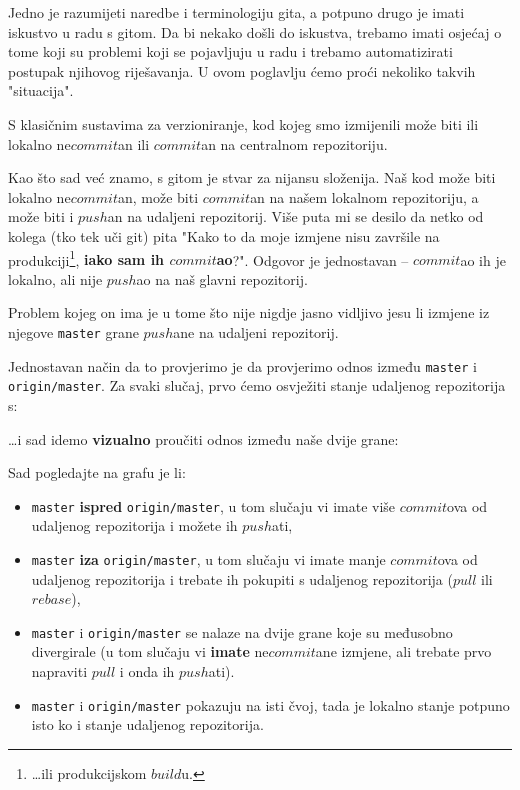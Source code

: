 
Jedno je razumijeti naredbe i terminologiju gita, a potpuno drugo je imati iskustvo u radu s gitom.
Da bi nekako došli do iskustva, trebamo imati osjećaj o tome koji su problemi koji se pojavljuju u radu i trebamo automatizirati postupak njihovog riješavanja.
U ovom poglavlju ćemo proći nekoliko takvih "situacija".


S klasičnim sustavima za verzioniranje, kod kojeg smo izmijenili može biti ili lokalno ne$commit$an ili $commit$an na centralnom repozitoriju.

Kao što sad već znamo, s gitom je stvar za nijansu složenija.
Naš kod može biti lokalno ne$commit$an, može biti $commit$an na našem lokalnom repozitoriju, a može biti i $push$an na udaljeni repozitorij.
Više puta mi se desilo da netko od kolega (tko tek uči git) pita "Kako to da moje izmjene nisu završile na produkciji\footnote{\dots{}ili produkcijskom $build$u.}, \textbf{iako sam ih $commit$ao}?".
Odgovor je jednostavan -- $commit$ao ih je lokalno, ali nije $push$ao na naš glavni repozitorij.

Problem kojeg on ima je u tome što nije nigdje jasno vidljivo jesu li izmjene iz njegove \verb+master+ grane $push$ane na udaljeni repozitorij.

Jednostavan način da to provjerimo je da provjerimo odnos između \verb+master+ i \verb+origin/master+.
Za svaki slučaj, prvo ćemo osvježiti stanje udaljenog repozitorija s:


\dots{}i sad idemo \textbf{vizualno} proučiti odnos između naše dvije grane:


Sad pogledajte na grafu je li:
\begin{itemize}
    \item \verb+master+ \textbf{ispred} \verb+origin/master+, u tom slučaju vi imate više $commit$ova od udaljenog repozitorija i možete ih $push$ati,
    \item \verb+master+ \textbf{iza} \verb+origin/master+, u tom slučaju vi imate manje $commit$ova od udaljenog repozitorija i trebate ih pokupiti s udaljenog repozitorija ($pull$ ili $rebase$),
    \item \verb+master+ i \verb+origin/master+ se nalaze na dvije grane koje su međusobno divergirale (u tom slučaju vi \textbf{imate} ne$commit$ane izmjene, ali trebate prvo napraviti $pull$ i onda ih $push$ati).
    \item \verb+master+ i \verb+origin/master+ pokazuju na isti čvoj, tada je lokalno stanje potpuno isto ko i stanje udaljenog repozitorija.
\end{itemize}

